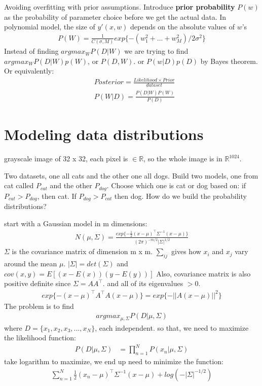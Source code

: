 \documentclass[11pt]{article}
\theoremstyle{plain}
\theoremstyle{definition}
\begin{document}
Avoiding overfitting with prior assumptions. Introduce \textbf{prior probability} $P(w)$ as the probability of parameter choice before we get the actual data. In polynomial model, the size of $y'(x,w)$ depends on the absolute values of $w$'s \begin{align*}
P(W) = \frac{1}{C(\sigma,M)} exp \{ -(w_1^2 +...+w_M^2)/2\sigma^2 \}
\end{align*}
Instead of finding $argmax_W P(D|W)$ we are trying to find $argmax_W P(D|W)p(W)$, or $P(D,W)$. or $P(w|D)p(D)$ by Bayes theorem. Or equivalently: \begin{align*}
&Posterior = \frac{Likelihood \times Prior}{dataset} \\
&P(W|D) = \frac{P(D|W) P(W)}{P(D)} 
\end{align*}


\section{Modeling data distributions}
grayscale image of 32 x 32, each pixel is $\in \mathbb{R}$, so the whole image is in $\mathbb{R}^{1024}$. 

Two datasets, one all cats and the other one all dogs. Build two models, one from cat called $P_{cat}$ and the other $P_{dog}$. Choose which one is cat or dog based on: if $P_{cat} > P_{dog}$, then cat. If $P_{dog} > P_{cat}$ then dog. How do we build the probability distributions?

start with a Gaussian model in m dimensions: \newline 
\begin{align*}
N(\mu, \Sigma) = \frac{exp \{ -\frac{1}{2}(x-\mu)^\top \Sigma^{-1}(x-\mu)\}}{(2\pi)^{-m/2} |\Sigma|^{1/2}}
\end{align*}
$\Sigma$ is the covariance matrix of dimension m x m.\newline 
$\sum_{ij}$ gives how $x_i $ and $ x_j$ vary around the mean $\mu$.\newline 
$|\Sigma| = det(\Sigma)$ and $cov(x,y) = E[(x-E(x))(y-E(y))]$\newline 
Also, covariance matrix is also positive definite since $\Sigma = AA^\top$. and all of its eigenvalues $> 0$.\newline 
\begin{align*}
exp\{ -(x-\mu)^\top A^\top A(x-\mu) \} = exp\{ -||A(x-\mu)||^2  \}
\end{align*}
The problem is to find
\begin{align*}
argmax_{\mu, \Sigma} P(D|\mu, \Sigma)
\end{align*}
where $D = \{ x_1, x_2, x_3, ..., x_N \}$, each independent. so that, we need to maximize the likelihood function: 
\begin{align*}
P(D|\mu, \Sigma) &= \prod_{n=1}^N P(x_n | \mu, \Sigma)  
\end{align*} 
take logarithm to maximize, we end up need to minimize the function: \begin{align*}
\sum_{n=1}^{N} \frac{1}{2} (x_n - \mu)^\top \Sigma^{-1}(x-\mu) + log(-|\Sigma|^{-1/2})
\end{align*}
\end{document}
